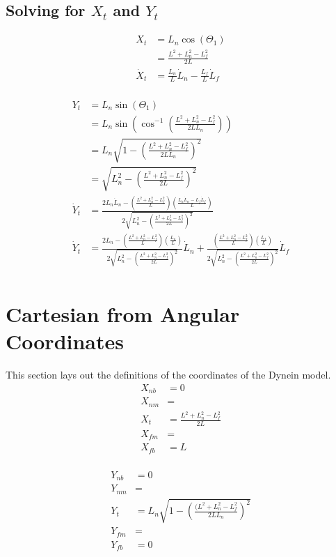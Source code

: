 \documentclass[11pt, landscape]{article}
\begin{document}
\subsection{Solving for $X_t$ and $Y_t$}

\begin{align}
  X_{t} &= L_n\cos(\Theta_{1}) \\
  &= \frac{L^2+L_n^2-L_f^2}{2L} \\
  \dot{X}_t &= \frac{L_n}{L}\dot{L}_n - \frac{L_f}{L}\dot{L}_f\\
\end{align}

\begin{align}
  Y_{t} &= L_n\sin(\Theta_{1}) \\
  &= L_n\sin\left(\cos^{-1}\left(\frac{L^2+L_n^2-L_f^2}{2LL_n}\right)\right) \\
  &= L_n\sqrt{1 - \left(\frac{L^2+L_n^2-L_f^2}{2LL_n}\right)^2} \\
  &= \sqrt{L_n^2 - \left(\frac{L^2+L_n^2-L_f^2}{2L}\right)^2} \\
  \dot{Y}_t &= \frac{2L_n\dot{L}_n - \left(\frac{L^2+L_n^2-L_f^2}{L}\right)\left(\frac{L_n\dot{L}_n - L_f\dot{L}_f}{L}\right)}{2\sqrt{L_n^2 - \left(\frac{L^2+L_n^2-L_f^2}{2L}\right)^2}}\\
  \dot{Y}_t &= \frac{2L_n - \left(\frac{L^2+L_n^2-L_f^2}{L}\right)\left(\frac{L_n}{L}\right)}{2\sqrt{L_n^2 - \left(\frac{L^2+L_n^2-L_f^2}{2L}\right)^2}}\dot{L}_n +
  \frac{\left(\frac{L^2+L_n^2-L_f^2}{L}\right)\left(\frac{L_f}{L}\right)}{2\sqrt{L_n^2 - \left(\frac{L^2+L_n^2-L_f^2}{2L}\right)^2}}\dot{L}_f\\
\end{align}

\section{Cartesian from Angular Coordinates}
This section lays out the definitions of the coordinates of the Dynein model. \\
\begin{align}
  X_{nb} &= 0 \\
  X_{nm} &=  \\
  X_{t}  &= \frac{L^2+L_n^2-L_f^2}{2L} \\
  X_{fm} &=  \\
  X_{fb} &= L \\
\end{align}

\begin{align}
  Y_{nb} &= 0 \\
  Y_{nm} &=  \\
  Y_{t}  &= L_n\sqrt{1 - \left(\frac{(L^2+L_n^2-L_f^2}{2LL_n}\right)^2} \\
  Y_{fm} &=  \\
  Y_{fb} &= 0
\end{align}
\end{document}
